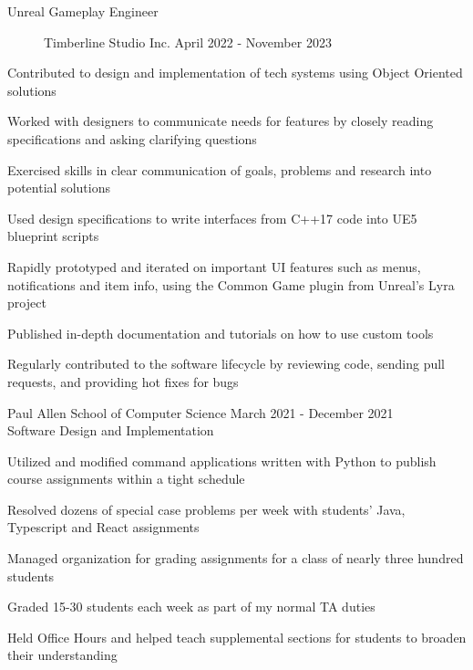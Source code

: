 \documentclass[10pt]{article}
\newenvironment{itemize*}
{\begin{itemize}[leftmargin=*]
    \setlength{\parskip}{0.5pt}}
{\end{itemize}}
\begin{document}
\begin{description}
\item[Unreal Gameplay Engineer] Timberline Studio Inc.
    \hfill April 2022 - November 2023
\end{description}
\begin{itemize*}
\item Contributed to design and implementation of tech systems using Object
      Oriented solutions
\item Worked with designers to communicate needs for features by closely
      reading specifications and asking clarifying questions
\item Exercised skills in clear communication of goals, problems and research
      into potential solutions
\item Used design specifications to write interfaces from C++17 code into
      UE5 blueprint scripts
\item Rapidly prototyped and iterated on important UI features such as menus,
      notifications and item info, using the Common Game plugin from Unreal's
      Lyra project
\item Published in-depth documentation and tutorials on how to use custom tools
\item Regularly contributed to the software lifecycle by reviewing code, sending
      pull requests, and providing hot fixes for bugs
\end{itemize*}
\vspace{10pt}

\begin{description}[leftmargin=!,
                    labelwidth=\widthof{\bfseries Lead Infrastructure TA}]

\item[Lead Infrastructure TA] Paul Allen School of Computer Science \hfill 
    March 2021 - December 2021\\
    Software Design and Implementation
\end{description}
\begin{itemize*}
\item Utilized and modified command applications written with Python to publish
      course assignments within a tight schedule
\item Resolved dozens of special case problems per week with students' Java,
      Typescript and React assignments
\item Managed organization for grading assignments for a class of nearly three
      hundred students
\item Graded 15-30 students each week as part of my normal TA duties
\item Held Office Hours and helped teach supplemental sections for students to
      broaden their understanding
\end{itemize*}
\end{document}

